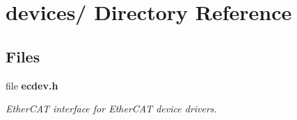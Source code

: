 \section{devices/ Directory Reference}
\label{dir_07b86ffc266b39efa5bbdc0e9fdb330a}
\subsection*{Files}
\begin{DoxyCompactItemize}
\item 
file {\bf ecdev.\-h}
\begin{DoxyCompactList}\small\item\em Ether\-C\-A\-T interface for Ether\-C\-A\-T device drivers. \end{DoxyCompactList}\end{DoxyCompactItemize}
